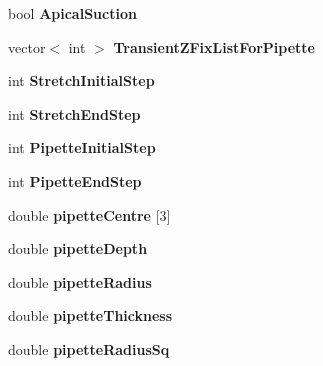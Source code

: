\begin{DoxyCompactItemize}
\item 
\hypertarget{classSimulation_a53d18b41ab9318966acb05815ab4deb0}{}bool {\bfseries Apical\+Suction}\label{classSimulation_a53d18b41ab9318966acb05815ab4deb0}

\item 
\hypertarget{classSimulation_a614017cf64e201c1897117b6ce31e17c}{}vector$<$ int $>$ {\bfseries Transient\+Z\+Fix\+List\+For\+Pipette}\label{classSimulation_a614017cf64e201c1897117b6ce31e17c}

\item 
\hypertarget{classSimulation_a973663e403ae2b5596f10f7933111c93}{}int {\bfseries Stretch\+Initial\+Step}\label{classSimulation_a973663e403ae2b5596f10f7933111c93}

\item 
\hypertarget{classSimulation_a4549e150051a2d4c7e9bb5d7c8194131}{}int {\bfseries Stretch\+End\+Step}\label{classSimulation_a4549e150051a2d4c7e9bb5d7c8194131}

\item 
\hypertarget{classSimulation_ab3f29a12d0630213fe58e14a0e198ca0}{}int {\bfseries Pipette\+Initial\+Step}\label{classSimulation_ab3f29a12d0630213fe58e14a0e198ca0}

\item 
\hypertarget{classSimulation_a7382cfd6abf17a8067e86cabf68f512f}{}int {\bfseries Pipette\+End\+Step}\label{classSimulation_a7382cfd6abf17a8067e86cabf68f512f}

\item 
\hypertarget{classSimulation_a80ba175cfd0377ddab49a0058139f03c}{}double {\bfseries pipette\+Centre} \mbox{[}3\mbox{]}\label{classSimulation_a80ba175cfd0377ddab49a0058139f03c}

\item 
\hypertarget{classSimulation_a6d987f6569d306688d272436294e85f4}{}double {\bfseries pipette\+Depth}\label{classSimulation_a6d987f6569d306688d272436294e85f4}

\item 
\hypertarget{classSimulation_a44f9a496fd5dcdb27e7e425350cfa5ae}{}double {\bfseries pipette\+Radius}\label{classSimulation_a44f9a496fd5dcdb27e7e425350cfa5ae}

\item 
\hypertarget{classSimulation_a330bde4b57359e57318c1105edde06c5}{}double {\bfseries pipette\+Thickness}\label{classSimulation_a330bde4b57359e57318c1105edde06c5}

\item 
\hypertarget{classSimulation_aee6fb6bd1bbed560039880b174a3a43c}{}double {\bfseries pipette\+Radius\+Sq}\label{classSimulation_aee6fb6bd1bbed560039880b174a3a43c}


\end{DoxyCompactItemize}
